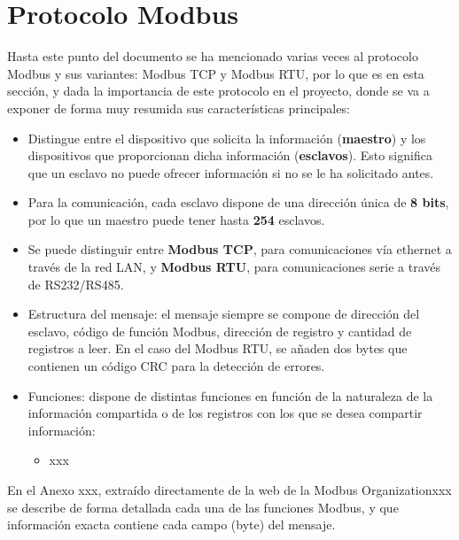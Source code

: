 \section{Protocolo Modbus}
\label{sec:modbus}

Hasta este punto del documento se ha mencionado varias veces al protocolo Modbus y sus variantes: Modbus TCP y Modbus RTU, por lo que es en esta sección, y dada la importancia de este protocolo en el proyecto, donde se va a exponer de forma muy resumida sus características principales:

\begin{itemize}
  \item Distingue entre el dispositivo que solicita la información (\textbf{maestro}) y los dispositivos que proporcionan dicha información (\textbf{esclavos}). Esto significa que un esclavo no puede ofrecer información si no se le ha solicitado antes.  
  \item Para la comunicación, cada esclavo dispone de una dirección única de \textbf{8 bits}, por lo que un maestro puede tener hasta \textbf{254} esclavos.
  \item Se puede distinguir entre \textbf{Modbus TCP}, para comunicaciones vía ethernet a través de la red LAN, y \textbf{Modbus RTU}, para comunicaciones serie a través de RS232/RS485.
  \item Estructura del mensaje: el mensaje siempre se compone de dirección del esclavo, código de función Modbus, dirección de registro y cantidad de registros a leer. En el caso del Modbus RTU, se añaden dos bytes que contienen un código CRC para la detección de errores.
  \item Funciones: dispone de distintas funciones en función de la naturaleza de la información compartida o de los registros con los que se desea compartir información:
  \begin{itemize}
    \item xxx
  \end{itemize}  
\end{itemize} 

En el Anexo xxx, extraído directamente de la web de la Modbus Organizationxxx se describe de forma detallada cada una de las funciones Modbus, y que información exacta contiene cada campo (byte) del mensaje.


